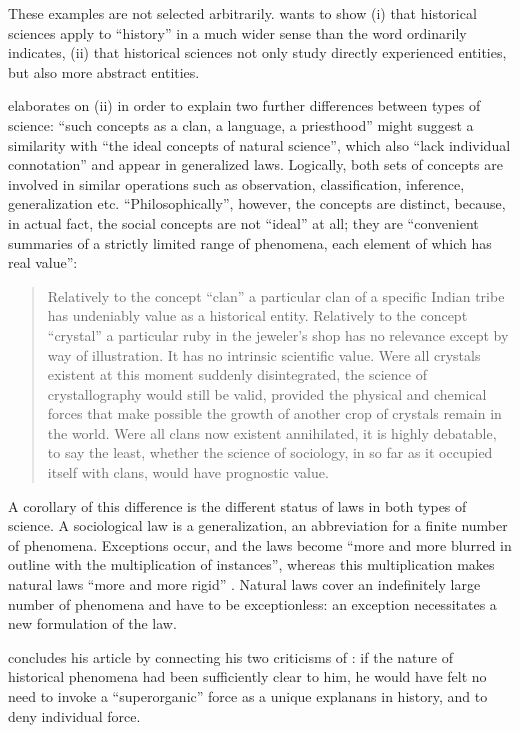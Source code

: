 \documentclass[output=paper]{langscibook}
\begin{document}
These examples are not selected arbitrarily. {\Sapir} wants to show (i) that historical sciences apply to ``history'' in a much wider sense than the word ordinarily indicates, (ii) that historical sciences not only study directly experienced entities, but also more abstract entities.

{\Sapir} elaborates on (ii) in order to explain two further differences between types of science: ``such concepts as a clan, a language, a priesthood'' might suggest a similarity with ``the ideal concepts of natural science'', which also ``lack individual connotation'' and appear in generalized laws. Logically, both sets of concepts are involved in similar operations such as observation, classification, inference, generalization etc. ``Philosophically'', however, the concepts are distinct, because, in actual fact, the social concepts are not ``ideal'' at all; they are ``convenient summaries of a strictly limited range of phenomena, each element of which has real value'':

\begin{quotation}
    Relatively to the concept ``clan'' a particular clan of a specific Indian tribe has undeniably value as a historical entity. Relatively to the concept ``crystal'' a particular ruby in the jeweler's shop has no relevance except by way of illustration. It has no intrinsic scientific value. Were all crystals existent at this moment suddenly disintegrated, the science of crystallography would still be valid, provided the physical and chemical forces that make possible the growth of another crop of crystals remain in the world. Were all clans now existent annihilated, it is highly debatable, to say the least, whether the science of sociology, in so far as it occupied itself with clans, would have prognostic value.
    \citep[446--447]{Sapir1917}
\end{quotation}

A corollary of this difference is the different status of laws in both types of science. A sociological law is a generalization, an abbreviation for a finite number of phenomena. Exceptions occur, and the laws become ``more and more blurred in outline with the multiplication of instances'', whereas this multiplication makes natural laws ``more and more rigid'' \citep[447]{Sapir1917}. Natural laws cover an indefinitely large number of phenomena and have to be exceptionless: an exception necessitates a new formulation of the law.

{\Sapir} concludes his article by connecting his two criticisms of {\Kroeber}: if the nature of historical phenomena had been sufficiently clear to him, he would have felt no need to invoke a ``superorganic'' force as a unique explanans in history, and to deny individual force.
\end{document}
